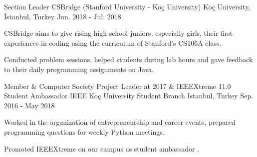 
\vspace*{-1.5mm}

\begin{cventries}


    \cventry
    {Section Leader}%
    {CSBridge (Stanford University - Koç University)}%
    {Koç University, İstanbul, Turkey}
    {Jun. 2018 - Jul. 2018}
    {
      \begin{cvitems}
        \item {CSBridge aims to give rising high school juniors, especially girls, their first experiences in coding using the curriculum of Stanford's CS106A class.} 	             
        \item{Conducted problem sessions, helped students during lab hours and gave feedback to their daily programming assignments on Java.}
      \end{cvitems}
    }

  \cventry
    {Member \& Computer Society Project Leader at 2017 \& IEEEXtreme 11.0 Student Ambassador}
    {IEEE Koç University Student Branch}
    {Istanbul, Turkey}
    {Sep. 2016 - May 2018}
    {
      \begin{cvitems}
        \item {Worked in the organization of entrepreneurship and career events, prepared programming questions for weekly Python meetings.}
        \item {Promoted IEEEXtreme on our campus as student ambassador .}
      \end{cvitems}
    }

\end{cventries}

